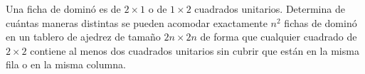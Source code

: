 Una ficha de dominó es de $2 \times 1$ o de $1 \times 2$ cuadrados unitarios. Determina de cuántas
maneras distintas se pueden acomodar exactamente $n^2$ fichas de dominó en un tablero de ajedrez de
tamaño $2n \times 2n$ de forma que cualquier cuadrado de $2 \times 2$ contiene al menos dos cuadrados unitarios
sin cubrir que están en la misma fila o en la misma columna.